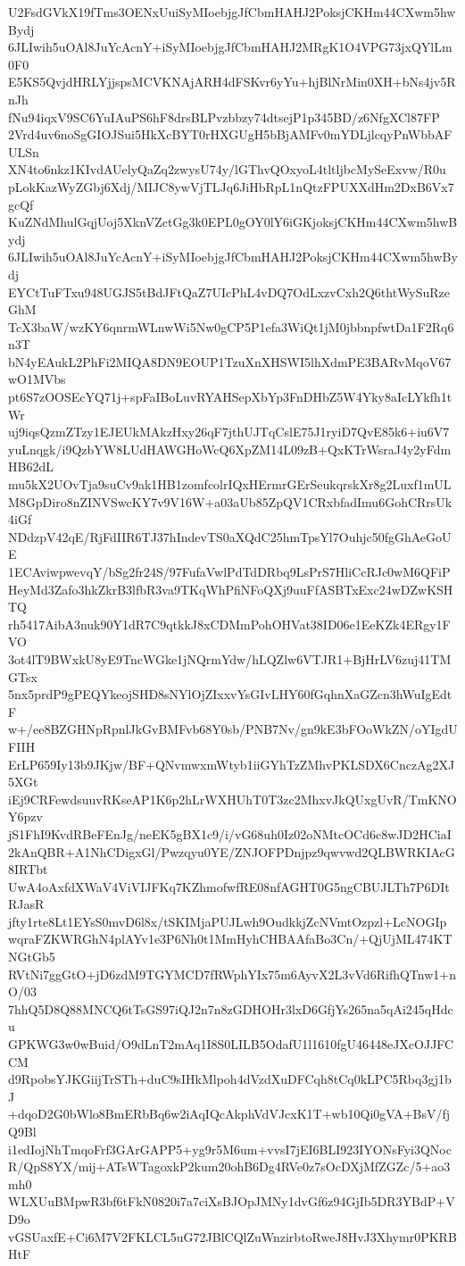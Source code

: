 U2FsdGVkX19fTms3OENxUuiSyMIoebjgJfCbmHAHJ2PoksjCKHm44CXwm5hwBydj
6JLIwih5uOAl8JuYcAcnY+iSyMIoebjgJfCbmHAHJ2MRgK1O4VPG73jxQYlLm0F0
E5KS5QvjdHRLYjjspsMCVKNAjARH4dFSKvr6yYu+hjBlNrMin0XH+bNs4jv5RnJh
fNu94iqxV9SC6YuIAuPS6hF8drsBLPvzbbzy74dtsejP1p345BD/z6NfgXCl87FP
2Vrd4uv6noSgGIOJSui5HkXcBYT0rHXGUgH5bBjAMFv0mYDLjlcqyPnWbbAFULSn
XN4to6nkz1KIvdAUelyQaZq2zwysU74y/lGThvQOxyoL4tltljbcMySeExvw/R0u
pLokKazWyZGbj6Xdj/MIJC8ywVjTLJq6JiHbRpL1nQtzFPUXXdHm2DxB6Vx7gcQf
KuZNdMhulGqjUoj5XknVZctGg3k0EPL0gOY0lY6iGKjoksjCKHm44CXwm5hwBydj
6JLIwih5uOAl8JuYcAcnY+iSyMIoebjgJfCbmHAHJ2PoksjCKHm44CXwm5hwBydj
EYCtTuFTxu948UGJS5tBdJFtQaZ7UIcPhL4vDQ7OdLxzvCxh2Q6thtWySuRzeGhM
TcX3baW/wzKY6qnrmWLnwWi5Nw0gCP5P1efa3WiQt1jM0jbbnpfwtDa1F2Rq6n3T
bN4yEAukL2PhFi2MIQA8DN9EOUP1TzuXnXHSWI5lhXdmPE3BARvMqoV67wO1MVbs
pt6S7zOOSEcYQ71j+spFaIBoLuvRYAHSepXbYp3FnDHbZ5W4Yky8aIcLYkfh1tWr
uj9iqsQzmZTzy1EJEUkMAkzHxy26qF7jthUJTqCslE75J1ryiD7QvE85k6+iu6V7
yuLnqgk/i9QzbYW8LUdHAWGHoWcQ6XpZM14L09zB+QxKTrWsraJ4y2yFdmHB62dL
mu5kX2UOvTja9suCv9ak1HB1zomfcolrIQxHErmrGErSeukqrskXr8g2Luxf1mUL
M8GpDiro8nZINVSwcKY7v9V16W+a03aUb85ZpQV1CRxbfadImu6GohCRrsUk4iGf
NDdzpV42qE/RjFdIIR6TJ37hIndevTS0aXQdC25hmTpsYl7Ouhjc50fgGhAeGoUE
1ECAviwpwevqY/bSg2fr24S/97FufaVwlPdTdDRbq9LsPrS7HliCcRJc0wM6QFiP
HeyMd3Zafo3hkZkrB3lfbR3va9TKqWhPfiNFoQXj9uuFfASBTxExc24wDZwKSHTQ
rh5417AibA3nuk90Y1dR7C9qtkkJ8xCDMmPohOHVat38ID06e1EeKZk4ERgy1FVO
3ot4lT9BWxkU8yE9TncWGke1jNQrmYdw/hLQZlw6VTJR1+BjHrLV6zuj41TMGTsx
5nx5prdP9gPEQYkeojSHD8sNYlOjZIxxvYsGIvLHY60fGqhnXaGZcn3hWuIgEdtF
w+/ee8BZGHNpRpnlJkGvBMFvb68Y0sb/PNB7Nv/gn9kE3bFOoWkZN/oYIgdUFIIH
ErLP659Iy13b9JKjw/BF+QNvmwxmWtyb1iiGYhTzZMhvPKLSDX6CnczAg2XJ5XGt
iEj9CRFewdsuuvRKseAP1K6p2hLrWXHUhT0T3zc2MhxvJkQUxgUvR/TmKNOY6pzv
jS1FhI9KvdRBeFEnJg/neEK5gBX1c9/i/vG68uh0Iz02oNMtcOCd6c8wJD2HCiaI
2kAnQBR+A1NhCDigxGl/Pwzqyu0YE/ZNJOFPDnjpz9qwvwd2QLBWRKIAcG8IRTbt
UwA4oAxfdXWaV4ViVIJFKq7KZhmofwfRE08nfAGHT0G5ngCBUJLTh7P6DItRJasR
jfty1rte8Lt1EYsS0mvD6l8x/tSKIMjaPUJLwh9OudkkjZcNVmtOzpzl+LcNOGIp
wqraFZKWRGhN4plAYv1e3P6Nh0t1MmHyhCHBAAfaBo3Cn/+QjUjML474KTNGtGb5
RVtNi7ggGtO+jD6zdM9TGYMCD7fRWphYIx75m6AyvX2L3vVd6RifhQTnw1+nO/03
7hhQ5D8Q88MNCQ6tTsGS97iQJ2n7n8zGDHOHr3lxD6GfjYs265na5qAi245qHdcu
GPKWG3w0wBuid/O9dLnT2mAq1I8S0LILB5OdafU1l1610fgU46448eJXcOJJFCCM
d9RpobsYJKGiijTrSTh+duC9sIHkMlpoh4dVzdXuDFCqh8tCq0kLPC5Rbq3gj1bJ
+dqoD2G0bWlo8BmERbBq6w2iAqIQcAkphVdVJcxK1T+wb10Qi0gVA+BsV/fjQ9Bl
i1edIojNhTmqoFrf3GArGAPP5+yg9r5M6um+vvsI7jEI6BLI923IYONsFyi3QNoc
R/QpS8YX/mij+ATsWTagoxkP2kum20ohB6Dg4RVe0z7sOcDXjMfZGZc/5+ao3mh0
WLXUuBMpwR3bf6tFkN0820i7a7ciXsBJOpJMNy1dvGf6z94GjIb5DR3YBdP+VD9o
vGSUaxfE+Ci6M7V2FKLCL5uG72JBlCQlZuWnzirbtoRweJ8HvJ3Xhymr0PKRBHtF
